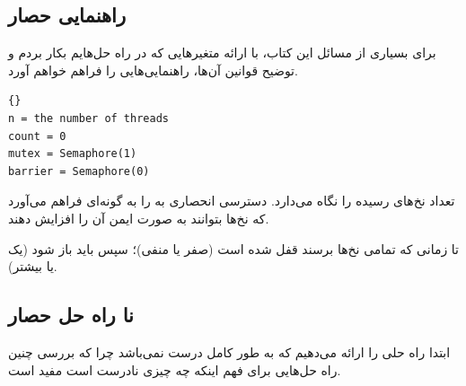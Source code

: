 \documentclass{book}
\newcommand{\clearemptydoublepage}{\newpage\cleardoublepage}
\begin{document}
\clearemptydoublepage
\subsection {راهنمایی حصار}


    برای بسیاری از مسائل این کتاب، با ارائه متغیرهایی که در راه  حل‌هایم  بکار بردم و توضیح قوانین آن‌ها، راهنمایی‌هایی را فراهم خواهم آورد. 

\begin{latin}
\begin{latin}
\begin{lstlisting}[title=\rl{راهنمایی حصار}]{}
n = the number of threads
count = 0
mutex = Semaphore(1)
barrier = Semaphore(0)
\end{lstlisting}
\end{latin}
\end{latin}

     تعداد نخ‌های رسیده را نگاه می‌دارد. 
     دسترسی انحصاری به  را 
    به گونه‌ای فراهم می‌آورد که نخ‌ها بتوانند به صورت ایمن آن را افزایش دهند. 

    تا زمانی که تمامی نخ‌ها برسند قفل شده است (صفر یا منفی)؛ سپس باید باز شود (یک یا بیشتر). 

\clearemptydoublepage
\subsection {نا راه حل حصار}

    ابتدا راه حلی را ارائه می‌دهیم که به طور کامل درست نمی‌باشد چرا که بررسی چنین راه حل‌هایی برای فهم اینکه چه چیزی نادرست است مفید است.
\end{document}
